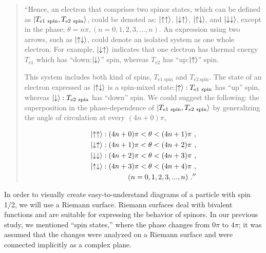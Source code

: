 \documentclass[reprint,amsmath,amssymb,aps,]{revtex4-1}
\numberwithin{equation}{section}%
\begin{document}
    \begin{quote}
        
    ``Hence, an electron that comprises two spinor states, which can be defined as $\ket{ T_{\mathrm{e1 \ spin}}, T_{\mathrm{e2 \ spin}} }$, could be denoted as: $\ket{\uparrow \uparrow}$, $\ket{\downarrow \uparrow}$, $\ket{\uparrow \downarrow}$, and $\ket{\downarrow \downarrow}$, except in the phase; $\theta = n \pi, (n= 0,1,2,3,...,n)$. An expression using two arrows, such as $\ket{\uparrow \downarrow}$, could denote an isolated system as one whole electron. For example, $\ket{\downarrow  \uparrow}$ indicates that one electron has thermal energy $T_{\mathrm{e1}}$ which has ``down:$\ket{\downarrow}$'' spin, whereas $T_{\mathrm{e2}}$ has ``up:$\ket{\uparrow}$'' spin.

    This system includes both kind of spins, $T_{\mathrm{e1 \ spin}}$ and $T_{\mathrm{e2 \ spin}}$. The state of an electron expressed as $\ket{\uparrow \downarrow}$ is a spin-mixed state:$\ket{\uparrow} : T_{\mathrm{e1 \ spin}}$ has ``up'' spin, whereas $\ket{\downarrow} : T_{\mathrm{e2 \ spin}}$ has ``down'' spin. We could suggest the following: the superposition in the phase-dependence of $\ket{ T_{\mathrm{e1 \ spin}}, T_{\mathrm{e2 \ spin}} }$ by generalizing the angle of circulation at every $(4n+0)\pi$,

        \begin{equation}
            \begin{split}
                \ket{\uparrow  \uparrow} : (4n+0) \pi < \theta < (4n+1)\pi \ , \\
                \ket{\downarrow \uparrow} : (4n+1)\pi < \theta < (4n+2)\pi \ , \\
                \ket{\downarrow \downarrow} : (4n+2)\pi < \theta < (4n+3)\pi \ , \\
                \ket{\uparrow \downarrow} : (4n+3)\pi < \theta < (4n+4)\pi \ , \\
                (n=0,1,2,3,...,n)
                \ .''
            \end{split}
            \label{e_spin_Te1_Te2}
        \end{equation}
    
    \end{quote}

    In order to visually create easy-to-understand diagrams of a particle with spin 1/2, we will use a Riemann surface. Riemann surfaces deal with bivalent functions and are suitable for expressing the behavior of spinors. In our previous study, we mentioned ``spin states,'' where the phase changes from $0 \pi$ to $4 \pi$; it was assumed that the changes were analyzed on a Riemann surface and were connected implicitly as a complex plane.
\end{document}
